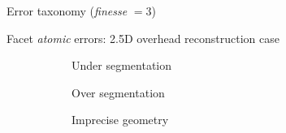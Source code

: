 \documentclass[10pt, export]{beamer}
\begin{document}
        \begin{frame}{Error taxonomy (\textit{finesse} $= 3$)}
            \begin{figure}
                
            \end{figure}
        \end{frame}
        \begin{frame}{Facet \textit{atomic} errors: 2.5D overhead reconstruction case}
            \begin{figure}
                \begin{center}
                    \begin{subfigure}{.28\textwidth}
                        \caption{\label{fig::fac_under} Under segmentation}
                    \end{subfigure}
                    \begin{subfigure}{.28\textwidth}
                        \caption{\label{fig::fac_over} Over segmentation}
                    \end{subfigure}
                    \begin{subfigure}{.28\textwidth}
                        \caption{\label{fig::fac_height} Imprecise geometry}
                    \end{subfigure}
                    \begin{subfigure}{.33\textwidth}

\end{subfigure}
\end{center}
\end{figure}
\end{frame}
\end{document}
